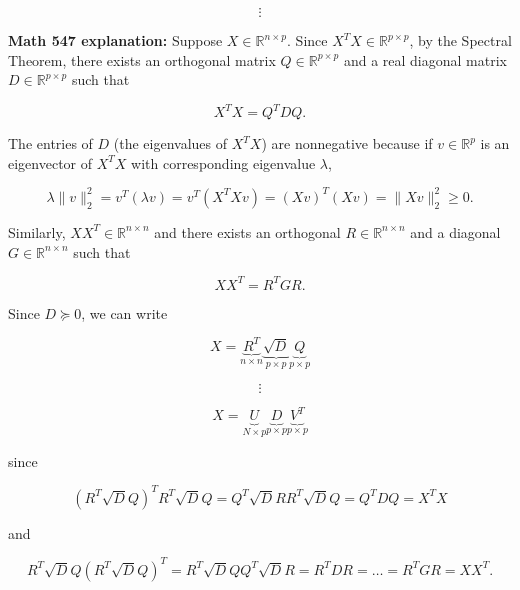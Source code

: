 %
%
%
%




\[
\vdots
\]

\textbf{Math 547 explanation:} Suppose \(X \in \mathbb{R}^{n \times p}\). Since \(X^TX \in \mathbb{R}^{p \times p}\), by the Spectral Theorem, there exists an orthogonal matrix \(Q \in \mathbb{R}^{p \times p}\) and a real diagonal matrix \(D \in \mathbb{R}^{p \times p}\) such that

\[
X^TX = Q^TDQ.
\]

The entries of \(D\) (the eigenvalues of \(X^TX\)) are nonnegative because if \(v \in \mathbb{R}^p\) is an eigenvector of \(X^TX\) with corresponding eigenvalue \(\lambda\),

\[
\lambda \lVert v \rVert_2^2 = v^T ( \lambda v) = v^T (X^TXv) = (Xv)^T (Xv) = \lVert X v \rVert_2^2 \geq 0.
\]

Similarly, \(XX^T \in \mathbb{R}^{n \times n}\) and there exists an orthogonal \(R \in \mathbb{R}^{n \times n}\) and a diagonal \(G \in \mathbb{R}^{n \times n}\) such that

\[
XX^T = R^TGR.
\]

Since \(D \succeq 0\), we can write

\[
X = \underbrace{R^T}_{n \times n} \underbrace{\sqrt{D}}_{p \times p} \underbrace{Q}_{p \times p}
\]

\[
\vdots
\]

\[
X = \underbrace{U}_{N \times p} \underbrace{D}_{p \times p} \underbrace{V^T}_{p \times p}
\]

since

\[
\left( R^T \sqrt{D} Q \right)^T R^T \sqrt{D} Q = Q^T \sqrt{D} R R^T \sqrt{D} Q = Q^TDQ = X^TX
\]

and

\[
 R^T \sqrt{D} Q \left( R^T \sqrt{D} Q \right)^T = R^T \sqrt{D} Q  Q^T \sqrt{D} R = R^TD R = \ldots = R^T G R =  XX^T.
\]


